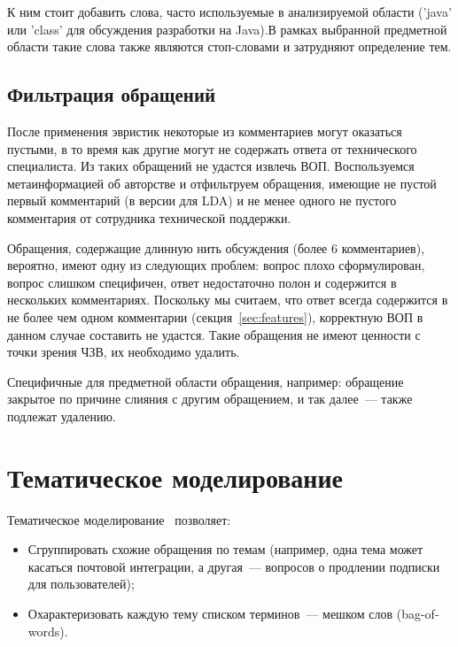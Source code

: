 К ним стоит добавить слова, часто используемые в анализируемой области ('java' или 'class' для обсуждения разработки на Java).В рамках выбранной предметной области такие слова также являются стоп-словами и затрудняют определение тем.

\subsection{Фильтрация обращений}
\label{subsec:ticketfilter}

После применения эвристик некоторые из комментариев могут оказаться пустыми, в то время как другие могут не содержать ответа от технического специалиста. Из таких обращений не удастся извлечь ВОП. Воспользуемся метаинформацией об авторстве и отфильтруем обращения, имеющие не пустой первый комментарий (в версии для LDA) и не менее одного не пустого комментария от сотрудника технической поддержки.

Обращения, содержащие длинную нить обсуждения (более 6 комментариев), вероятно, имеют одну из следующих проблем: вопрос плохо сформулирован, вопрос слишком специфичен, ответ недостаточно полон и содержится в нескольких комментариях. Поскольку мы считаем, что ответ всегда содержится в не более чем одном комментарии (секция~\ref{sec:features}), корректную ВОП в данном случае составить не удастся. Такие обращения не имеют ценности с точки зрения ЧЗВ, их необходимо удалить.

Специфичные для предметной области обращения, например: обращение закрытое по причине слияния с другим обращением, и так далее~--- также подлежат удалению.

\section{Тематическое моделирование}
\label{sec:topicmodeling}

Тематическое моделирование~\cite{TM} позволяет:
\begin{itemize}
\item Сгруппировать схожие обращения по темам (например, одна тема может касаться почтовой интеграции, а другая~--- вопросов о продлении подписки для пользователей);
\item Охарактеризовать каждую тему списком терминов~--- мешком слов (\mbox{bag-of-words}).
\end{itemize}

